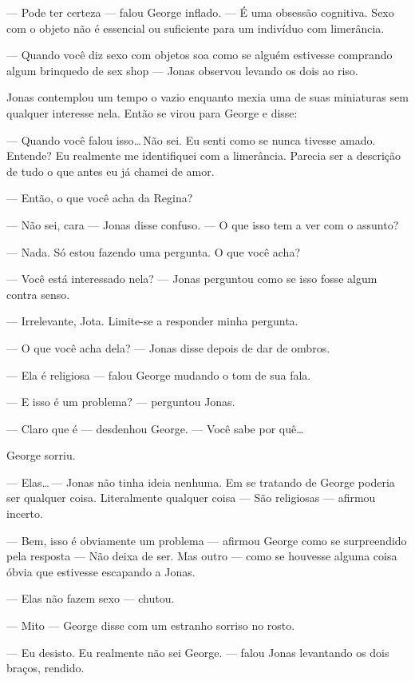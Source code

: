 --- Pode ter certeza --- falou George inflado. --- É uma obsessão cognitiva. Sexo com o objeto não é essencial ou suficiente para um indivíduo com limerância.

--- Quando você diz sexo com objetos soa como se alguém estivesse comprando algum brinquedo de sex shop --- Jonas observou levando os dois ao riso.

Jonas contemplou um tempo o vazio enquanto mexia uma de suas miniaturas sem qualquer interesse nela. Então se virou para George e disse:

--- Quando você falou isso\ldots\,Não sei. Eu senti como se nunca tivesse amado. Entende? Eu realmente me identifiquei com a limerância. Parecia ser a descrição de tudo o que antes eu já chamei de amor.

--- Então, o que você acha da Regina?

--- Não sei, cara --- Jonas disse confuso. ---  O que isso tem a ver com o assunto?

--- Nada. Só estou fazendo uma pergunta. O que você acha?

--- Você está interessado nela? --- Jonas perguntou como se isso fosse algum contra senso.

--- Irrelevante, Jota. Limite-se a responder minha pergunta.

--- O que você acha dela? --- Jonas disse\mudanca{,} depois de dar de ombros.

--- Ela é religiosa --- falou George\mudanca{,} mudando o tom de sua fala.

--- E isso é um problema? --- perguntou Jonas.

--- Claro que é --- desdenhou George. --- Você sabe por quê\ldots

George sorriu.

--- Elas\ldots\,--- Jonas não tinha ideia nenhuma. Em se tratando de George\mudanca{,} poderia ser qualquer coisa. Literalmente qualquer coisa --- São religiosas --- afirmou incerto.

--- Bem, isso é obviamente um problema --- afirmou George como se surpreendido pela resposta ---  Não deixa de ser. Mas outro --- como se houvesse alguma coisa óbvia que estivesse escapando a Jonas.

--- Elas não fazem sexo --- chutou.

--- Mito --- George disse com um estranho sorriso no rosto.

--- Eu desisto. Eu realmente não sei George. --- falou Jonas levantando os dois braços, rendido.

